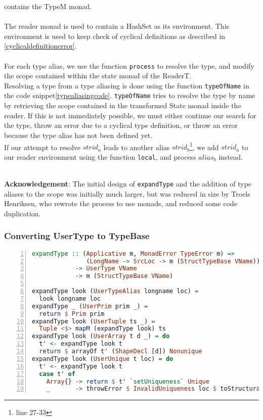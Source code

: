 contains the TypeM monad.
\\
\\
\noindent
The reader monad is used to contain a HashSet as its environment. This
environment is used to keep check of cyclical definitions as described in
\ref{cyclicaldefinitionerror}.
\\
\\
For each type alias, we use the function \texttt{process} to resolve the type, and modify
the scope contained within the state monad of the ReaderT.
\\
Resolving a type from a type aliasing is done using the function \texttt{typeOfName} in
the code snippet\ref{typealiasingcode}. \texttt{typeOfName} tries to
resolve the type by name by retrieving the scope contained in the transformed
State monad inside the reader.
\clearpage
\noindent
If this is not immediately possible, we must either continue our search for the type, throw an error due to a cyclical type definition, or throw an error because the type alias has not been defined yet.
\\
If our attempt to resolve $strid_a$ leads to another alias
$strid_b$\footnote{line 27-33}, we add
$strid_a$ to our reader environment using the function \texttt{local}, and
process $alias_b$ instead.
\\
\\
\begin{tcolorbox}
\textbf{Acknowledgement}: The initial design of \texttt{expandType} and the addition of
type aliases to the scope was initially much larger, but was reduced in size by
Troels Henriksen, who rewrote the process to use monads, and reduced some code
duplication. 
\end{tcolorbox}
\subsubsection{Converting UserType to TypeBase}
\begin{lstlisting}[language=Haskell, numbers=left]
expandType :: (Applicative m, MonadError TypeError m) =>
               (LongName -> SrcLoc -> m (StructTypeBase VName))
            -> UserType VName
            -> m (StructTypeBase VName)

expandType look (UserTypeAlias longname loc) =
  look longname loc
expandType _ (UserPrim prim _) =
  return $ Prim prim
expandType look (UserTuple ts _) =
  Tuple <$> mapM (expandType look) ts
expandType look (UserArray t d _) = do
  t' <- expandType look t
  return $ arrayOf t' (ShapeDecl [d]) Nonunique
expandType look (UserUnique t loc) = do
  t' <- expandType look t
  case t' of
    Array{} -> return $ t' `setUniqueness` Unique
    _       -> throwError $ InvalidUniqueness loc $ toStructural t'

\end{lstlisting}

